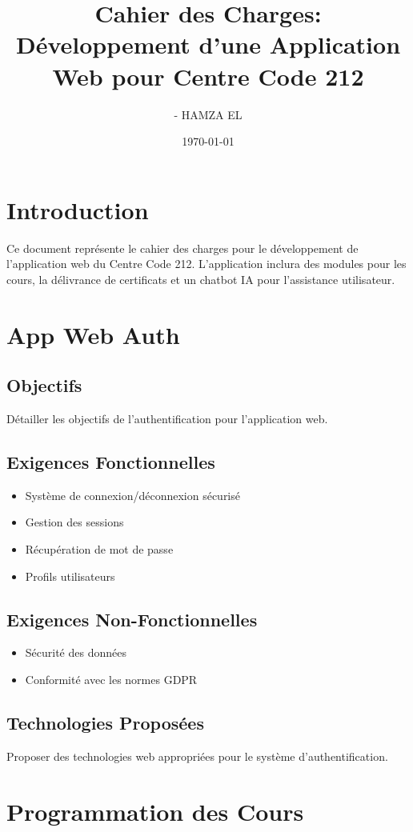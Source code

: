 \documentclass[12pt, letterpaper]{article}
\title{Cahier des Charges: Développement d'une Application Web pour Centre Code 212}
\author{- HAMZA EL }
\date{\today}
\begin{document}
\maketitle

\newpage

\section{Introduction}
Ce document représente le cahier des charges pour le développement de l'application web du Centre Code 212. L'application inclura des modules pour les cours, la délivrance de certificats et un chatbot IA pour l'assistance utilisateur.

\section{App Web Auth}
\subsection{Objectifs}
Détailler les objectifs de l'authentification pour l'application web.
\subsection{Exigences Fonctionnelles}
\begin{itemize}
    \item Système de connexion/déconnexion sécurisé
    \item Gestion des sessions
    \item Récupération de mot de passe
    \item Profils utilisateurs
\end{itemize}
\subsection{Exigences Non-Fonctionnelles}
\begin{itemize}
    \item Sécurité des données
    \item Conformité avec les normes GDPR
\end{itemize}
\subsection{Technologies Proposées}
Proposer des technologies web appropriées pour le système d'authentification.

\section{Programmation des Cours}
\end{document}
